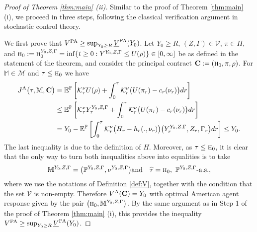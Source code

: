 \documentclass[11pt,a4paper]{article}
\numberwithin{equation}{section}
\def\dbE{\mathbb{E}}
\def\dbM{\mathbb{M}}
\def\dbP{\mathbb{P}}
\newcommand{\cK}{\mathcal{K}}
\newcommand{\cM}{\mathcal{M}}
\newcommand{\cV}{\mathcal{V}}
\newcommand{\Cbf}{\mathbf{C}}
\def\no{\noindent}
\def\q{\quad}
\def\t {\tau}
\newcommand{\bea}{\begin{eqnarray}}
\newcommand{\eea}{\end{eqnarray}}
\theoremstyle{definition}
\begin{document}
\begin{proof}[Proof of Theorem \ref{thm:main} {\rm (ii)}] 
 Similar to the proof of Theorem \ref{thm:main} (i), we proceed in three steps, following the classical verification argument in stochastic control theory.

\vspace{3mm}

\no {\bf Step 1.}\q 
  We first prove that $ V^{\rm PA} \ge \sup_{Y_0\ge R} \underline{V}^{\rm PA}(Y_0)$. 
  Let $Y_0\ge R$, $(Z,\Gamma)\in\cV$, $\pi\in \Pi$, and $\mbox{\sc h}_0:=\mbox{\sc h}_0^{Y_0,Z,\Gamma}=\inf\{t\ge 0: Y^{Y_0,Z,\Gamma}\le U(\rho)\}\in[0,\infty]$ be as defined in the statement of the theorem, 
     and consider the principal contract $\Cbf:=(\mbox{\sc h}_0, \pi,\rho)$. 
  For $\dbM\in \cM$ and $\t \le \mbox{\sc h}_0$ we have
     \begin{align*}
       J^{\rm A}\big(\t, \dbM,\Cbf\big) 
        &= \dbE^\dbP\left[\cK^\nu_\tau U(\rho)  + \int_0^\tau \cK^\nu_r\big(U(\pi_r)-c_r(\nu_r)\big)dr\right] \\
        & \le \dbE^\dbP\left[\cK^\nu_\tau Y^{Y_0,Z,\Gamma}_\t + \int_0^\tau \cK^\nu_r\big(U(\pi_r)-c_r(\nu_r)\big)dr\right] \\
        &= Y_0 - \dbE^{\dbP}\left[\int_0^\tau\cK_r^{\nu} \big(H_r- h_r(.,\nu_r)\big)\big(Y_r^{Y_0,Z,\Gamma},Z_r,\Gamma_r\big) dr\right] \le Y_0.
     \end{align*}
  The last inequality is due to the definition of $H$. Moreover, as $\tau\le\mbox{\sc h}_0$, it is clear that the only way to turn both inequalities above into equalities is to take 
    \bea\label{verif-American}
      \dbM^{Y_0,Z,\Gamma} = \big(\dbP^{Y_0,Z,\Gamma},\nu^{Y_0,Z,\Gamma}\big)
          &\mbox{and}&
      \widehat\t =\mbox{\sc h}_0,~\dbP^{Y_0,Z,\Gamma}\mbox{-a.s.}, 
    \eea
    where we use the notations of Definition \ref{def:V}, together with the condition that the set $\cV$ is non-empty. 
  Therefore $V^{\rm A}(\Cbf)=Y_0$ with optimal American agent response given by the pair $\big(\mbox{\sc h}_0, \dbM^{Y_0,Z,\Gamma}\big)$. 
  By the same argument as in Step 1 of the proof of Theorem \ref{thm:main} (i), this provides the inequality $V^{\rm PA} \ge \sup_{Y_0\ge R} \underline{V}^{\rm PA}(Y_0)$.

\vspace{3mm}


\end{proof}
\end{document}

